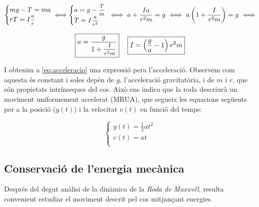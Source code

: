 \documentclass[11pt]{article}
\newcommand{\centered}[1]{\begin{tabular}{l} #1 \end{tabular}}
\begin{document}
        \begin{equation*}
            \begin{cases}
                mg-T=ma\\
                rT=I\mfrac{a}{r}\\            
            \end{cases}
            \hspace{-0.3cm}\Longleftrightarrow
            \begin{cases}
                a=g-\mfrac{T}{m}\\
                T=I\mfrac{a}{r^2}\\            
            \end{cases}
            \hspace{-0.2cm}\Longleftrightarrow
            \ a+\frac{Ia}{r^2m}=g\ \Longleftrightarrow\ a\left(1+\frac{I}{r^2m}\right)=g\ \Longleftrightarrow
        \end{equation*}
    
        \begin{equation}
            \begin{tabular}{ @{}c@{} @{}c@{} }
                \centered{$\boxed{a=\frac{g}{1+\mfrac{I}{r^2 m}}}$} & \centered{$\boxed{I=\left(\frac{g}{a}-1\right)r^2m}$}\\
            \end{tabular}
            \label{eq:acceleracio}
        \end{equation}
    
        I obtenim a \ref{eq:acceleracio} una expressió pera l'acceleració. Observem com aquesta és constant i soles depèn de $g$, l'acceleració gravitatòria, i de $m$ i $r$, que són propietats intrínseques del cos. Això ens indica que la roda descriurà un moviment uniformement accelerat (MRUA), que segueix les equacions següents per a la posició ($y(t)$) i la velocitat $v(t)$ en funció del temps:
    
        \begin{equation}
            \begin{cases}
                y(t) = \frac12 at^2\\
                v(t) = at\\
            \end{cases}
            \label{eq:mrua}
        \end{equation}

    \clearpage
    \vspace{-0.4cm}
    \subsection{Conservació de l'energia mecànica}
        Després del degut anàlisi de la dinàmica de la \textit{Roda de Maxwell}, resulta convenient estudiar el moviment descrit pel cos mitjançant energies.
\end{document}
